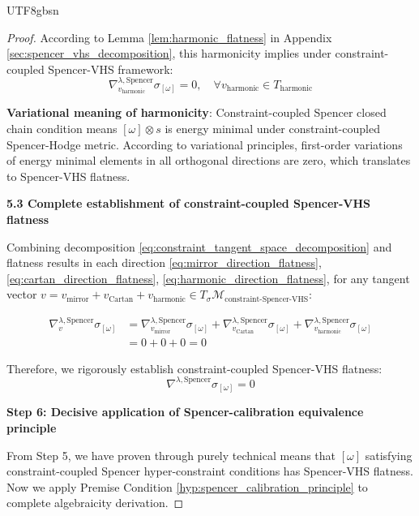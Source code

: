 \documentclass[a4paper,12pt]{extarticle}
\theoremstyle{definition}
\begin{document}
\begin{CJK}{UTF8}{gbsn}
\begin{proof}
According to Lemma \ref{lem:harmonic_flatness} in Appendix \ref{sec:spencer_vhs_decomposition}, this harmonicity implies under constraint-coupled Spencer-VHS framework:
\begin{equation}
\label{eq:harmonic_direction_flatness}
\nabla^{\lambda,\text{Spencer}}_{v_{\text{harmonic}}} \sigma_{[\omega]} = 0, \quad \forall v_{\text{harmonic}} \in T_{\text{harmonic}}
\end{equation}

\textbf{Variational meaning of harmonicity}: Constraint-coupled Spencer closed chain condition means $[\omega] \otimes s$ is energy minimal under constraint-coupled Spencer-Hodge metric. According to variational principles, first-order variations of energy minimal elements in all orthogonal directions are zero, which translates to Spencer-VHS flatness.

\textbf{5.3 Complete establishment of constraint-coupled Spencer-VHS flatness}

Combining decomposition \eqref{eq:constraint_tangent_space_decomposition} and flatness results in each direction \eqref{eq:mirror_direction_flatness}, \eqref{eq:cartan_direction_flatness}, \eqref{eq:harmonic_direction_flatness}, for any tangent vector $v = v_{\text{mirror}} + v_{\text{Cartan}} + v_{\text{harmonic}} \in T_{\sigma} \mathcal{M}_{\text{constraint-Spencer-VHS}}$:

\begin{align}
\nabla^{\lambda,\text{Spencer}}_v \sigma_{[\omega]} &= \nabla^{\lambda,\text{Spencer}}_{v_{\text{mirror}}} \sigma_{[\omega]} + \nabla^{\lambda,\text{Spencer}}_{v_{\text{Cartan}}} \sigma_{[\omega]} + \nabla^{\lambda,\text{Spencer}}_{v_{\text{harmonic}}} \sigma_{[\omega]} \label{eq:constraint_nabla_decomposition}\\
&= 0 + 0 + 0 = 0 \label{eq:constraint_total_flatness}
\end{align}

Therefore, we rigorously establish constraint-coupled Spencer-VHS flatness:
\begin{equation}
\label{eq:constraint_spencer_vhs_flatness_established}
\nabla^{\lambda,\text{Spencer}} \sigma_{[\omega]} = 0
\end{equation}

\textbf{Step 6: Decisive application of Spencer-calibration equivalence principle}

From Step 5, we have proven through purely technical means that $[\omega]$ satisfying constraint-coupled Spencer hyper-constraint conditions has Spencer-VHS flatness. Now we apply Premise Condition \ref{hyp:spencer_calibration_principle} to complete algebraicity derivation.


\end{proof}
\end{CJK}
\end{document}
